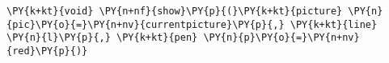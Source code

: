 \begin{Verbatim}[commandchars=\\\{\}]
    \PY{k+kt}{void} \PY{n+nf}{show}\PY{p}{(}\PY{k+kt}{picture} \PY{n}{pic}\PY{o}{=}\PY{n+nv}{currentpicture}\PY{p}{,} \PY{k+kt}{line} \PY{n}{l}\PY{p}{,} \PY{k+kt}{pen} \PY{n}{p}\PY{o}{=}\PY{n+nv}{red}\PY{p}{)}
\end{Verbatim}
